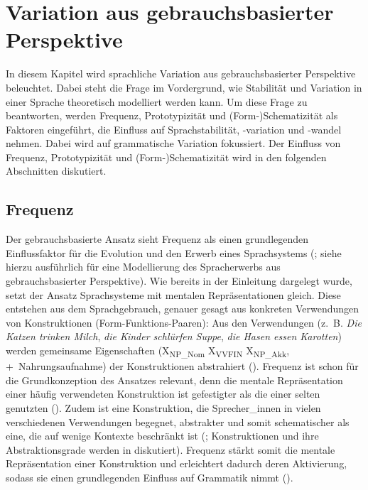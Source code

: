 \chapter{Variation aus gebrauchsbasierter Perspektive}
\label{variationallg}

In diesem Kapitel wird sprachliche Variation aus gebrauchsbasierter Perspektive beleuchtet. Dabei steht die Frage im Vordergrund, wie Stabilität und Variation in einer Sprache theoretisch modelliert werden kann. Um diese Frage zu beantworten, werden Frequenz, Prototypizität und (Form-)\-Schematizität als Faktoren eingeführt, die Einfluss auf Sprachstabilität, -variation und -wandel nehmen. Dabei wird auf grammatische Variation fokussiert. Der Einfluss von Frequenz, Prototypizität und (Form-)Schematizität wird in den folgenden Abschnitten diskutiert. 

\section{Frequenz}\label{steuerungfreq}
\begin{sloppypar}
Der gebrauchsbasierte Ansatz sieht Frequenz als einen grundlegenden Einflussfaktor für die Evolution und den Erwerb eines Sprachsystems (\cites[x]{Kemmer.2000}[1--2]{Diessel.2017}; siehe hierzu ausführlich \cite{Tomasello.2009} für eine Modellierung des Spracherwerbs aus gebrauchsbasierter Perspektive). Wie bereits in der Einleitung dargelegt wurde, setzt der Ansatz Sprachsysteme mit mentalen Repräsentationen gleich. Diese entstehen aus dem Sprachgebrauch, genauer gesagt aus konkreten Verwendungen von Konstruktionen (Form-Funktions-Paaren): Aus den Verwendungen (z.~B. \textit{Die Katzen trinken Milch}, \textit{die Kinder schlürfen Suppe}, \textit{die Hasen essen Karotten}) werden gemeinsame Eigenschaften (X\textsubscript{NP\_Nom} X\textsubscript{VVFIN} X\textsubscript{NP\_Akk}, +~Nahrungsaufnahme) der Konstruktionen abstrahiert (\cites[20--29]{Tomasello.1992}[168--170]{Ellis.2002b}[220]{Langacker.2008}). Frequenz ist schon für die Grundkonzeption des Ansatzes relevant, denn die mentale Repräsentation einer häufig verwendeten Konstruktion ist gefestigter als die einer selten genutzten (\cite[380]{Bybee.1997}). Zudem ist eine Konstruktion, die Spre\-\mbox{cher\_in}\-nen in vielen verschiedenen Verwendungen begegnet, abstrakter und somit schematischer als eine, die auf wenige Kontexte beschränkt ist (\cite[67--68]{Goldberg.2019}; Konstruktionen und ihre Abstraktionsgrade werden in  diskutiert). Frequenz stärkt somit die mentale Repräsentation einer Konstruktion und erleichtert dadurch deren Aktivierung, sodass sie einen grundlegenden Einfluss auf Grammatik nimmt (\cite[1--2]{Diessel.2017}). 
\end{sloppypar}


